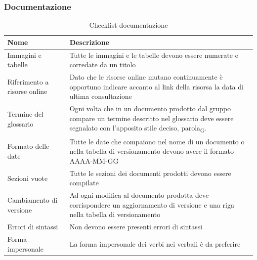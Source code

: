 \documentclass[a4paper,12pt]{article}
\begin{document}
            \subsubsection{Documentazione}
                \begin{longtable}{|M{3.5cm}|M{8.5cm}|}

                    \caption{Checklist documentazione} \\
                    \hline
                    \textbf{Nome} & \textbf{Descrizione} \\
                    \hline
                    \endhead

                    Immagini e tabelle & Tutte le immagini e le tabelle devono essere numerate e corredate da un titolo \\
                    \hline

                    Riferimento a risorse online & Dato che le risorse online mutano continuamente è opportuno indicare accanto al link della risorsa la data di ultima consultazione \\
                    \hline

                    Termine del glossario & Ogni volta che in un documento prodotto dal gruppo compare un termine descritto nel glossario deve essere segnalato con l’apposito stile deciso, parola\textsubscript{G}.\\
                    \hline

                    Formato delle date & Tutte le date che compaiono nel nome di un documento o nella tabella di versionamento devono avere il formato AAAA-MM-GG \\
                    \hline

                    Sezioni vuote & Tutte le sezioni dei documenti prodotti devono essere compilate \\
                    \hline

                    Cambiamento di versione & Ad ogni modifica al documento prodotta deve corrispondere un aggiornamento di versione e una riga nella tabella di versionamento \\
                    \hline

                    Errori di sintassi & Non devono essere presenti errori di sintassi \\
                    \hline

                    Forma impersonale & La forma impersonale dei verbi nei verbali è da preferire \\
                    \hline


\end{longtable}
\end{document}

